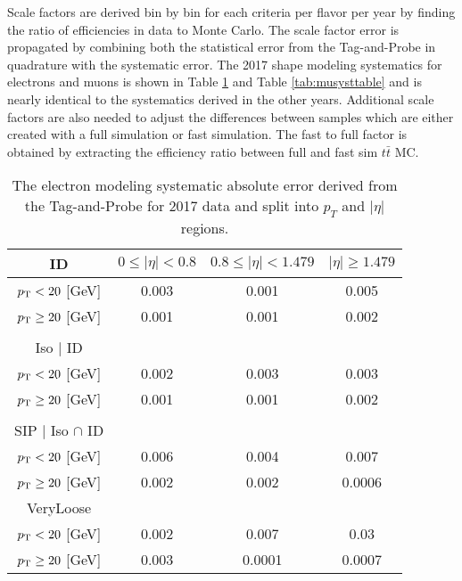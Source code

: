 Scale factors are derived bin by bin for each criteria per flavor per year by finding the ratio of efficiencies in data to Monte Carlo. The scale factor error is propagated by combining both the statistical error from the Tag-and-Probe in quadrature with the systematic error. The 2017 shape modeling systematics for electrons and muons is shown in Table \ref{tab:elesysts} and Table \ref{tab:musysttable} and is nearly identical to the systematics derived in the other years. Additional scale factors are also needed to adjust the differences between samples which are either created with a full simulation or fast simulation. The fast to full factor is obtained by extracting the efficiency ratio between  full and fast sim $t\bar{t}$ MC.

	
\begin{table}
\centering
\caption{The electron modeling systematic absolute error derived from the Tag-and-Probe for 2017 data and split into $p_T$ and $|\eta|$ regions. }
\label{tab:elesysts}
\begin{tabular}{|c|ccc|}
\hline
ID & $0\leq |\eta|<0.8$ & $0.8\leq |\eta|<1.479$ & $|\eta|\geq1.479$ \\
\hline
$p_{\mathrm{T}} < 20$ [GeV] & 0.003 & 0.001 & 0.005 \\
$p_{\mathrm{T}} \geq 20$ [GeV] & 0.001 & 0.001 & 0.002  \\
 &  &  &    \\
\hline
Iso $|$ ID  &  &  &   \\
\hline
$p_{\mathrm{T}} < 20$ [GeV] & 0.002 & 0.003 & 0.003   \\
$p_{\mathrm{T}} \geq 20$ [GeV] & 0.001 & 0.001 & 0.002 \\
 &  &  &   \\
\hline
SIP $|$ Iso $\cap$ ID &  &  &  \\
\hline
$p_{\mathrm{T}} < 20$ [GeV]& 0.006 & 0.004 & 0.007 \\
$p_{\mathrm{T}} \geq 20$ [GeV]& 0.002 & 0.002 & 0.0006  \\
\hline
VeryLoose &  &  &  \\
\hline
$p_{\mathrm{T}} < 20$ [GeV]& 0.002 & 0.007 & 0.03 \\
$p_{\mathrm{T}} \geq 20$ [GeV]& 0.003 & 0.0001 & 0.0007 \\
\hline
\end{tabular}
\end{table}


